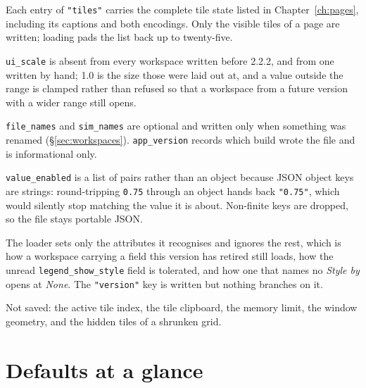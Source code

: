 \documentclass[11pt,a4paper,oneside]{report}
\newcommand{\appver}{2.2.2}
\newcommand{\code}[1]{\texttt{#1}}
\begin{document}
Each entry of \code{"tiles"} carries the complete tile state listed in
Chapter~\ref{ch:pages}, including its captions and both encodings. Only the
visible tiles of a page are written; loading pads the list back up to
twenty-five.

\code{ui\_scale} is absent from every workspace written before \appver{}, and
from one written by hand; 1.0 is the size those were laid out at, and a value
outside the range is clamped rather than refused so that a workspace from a
future version with a wider range still opens.

\code{file\_names} and \code{sim\_names} are optional and written only when
something was renamed (\S\ref{sec:workspaces}). \code{app\_version} records
which build wrote the file and is informational only.

\code{value\_enabled} is a list of pairs rather than an object because JSON
object keys are strings: round-tripping \code{0.75} through an object hands back
\code{"0.75"}, which would silently stop matching the value it is about.
Non-finite keys are dropped, so the file stays portable JSON.

The loader sets only the attributes it recognises and ignores the rest, which is
how a workspace carrying a field this version has retired still loads, how the
unread \code{legend\_show\_style} field is tolerated, and how one that names no
\emph{Style by} opens at \emph{None}. The \code{"version"} key is written but nothing
branches on it.

Not saved: the active tile index, the tile clipboard, the memory limit, the
window geometry, and the hidden tiles of a shrunken grid.

\chapter{Defaults at a glance}
\end{document}
